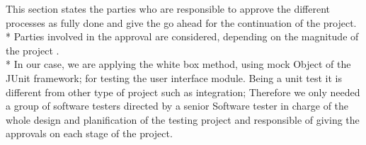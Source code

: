 This section states the parties who are responsible to approve the different processes as fully done and give the go ahead for the continuation of the project.  \\*  
Parties involved in the approval  are considered, depending on the magnitude of the project . \\*
In our case, we are applying the white box method, using mock Object of the JUnit framework; for testing the user interface module. Being a unit test it is different from other type of project such as integration; Therefore we only needed a group of software testers directed by a senior Software tester in charge of the whole design and planification of the testing project and responsible of giving the approvals on each stage of the project.                              